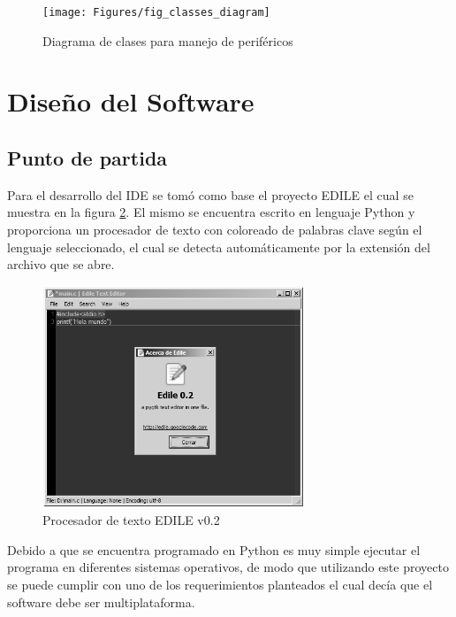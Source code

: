\begin{figure}[ht]
  \centering
    \texttt{[image: Figures/fig\_classes\_diagram]}
  \caption{Diagrama de clases para manejo de periféricos}
  \label{fig:classes}
\end{figure}

\section{Diseño del Software}

\subsection{Punto de partida} 

Para el desarrollo del IDE se tomó como base el proyecto EDILE \cite{edile} el cual se muestra en la figura \ref{fig:edile}. El mismo se encuentra escrito en lenguaje Python y proporciona un procesador de texto con coloreado de palabras clave según el lenguaje seleccionado, el cual se detecta automáticamente por la extensión del archivo que se abre.

\begin{figure}[ht]
  \centering
    \includegraphics[width=0.7\textwidth]{Figures/fig_edile}
  \caption{Procesador de texto EDILE v0.2}
  \label{fig:edile}
\end{figure}

Debido a que se encuentra programado en Python es muy simple ejecutar el programa en diferentes sistemas operativos, de modo que utilizando este proyecto se puede cumplir con uno de los requerimientos planteados el cual decía que el software debe ser multiplataforma.

